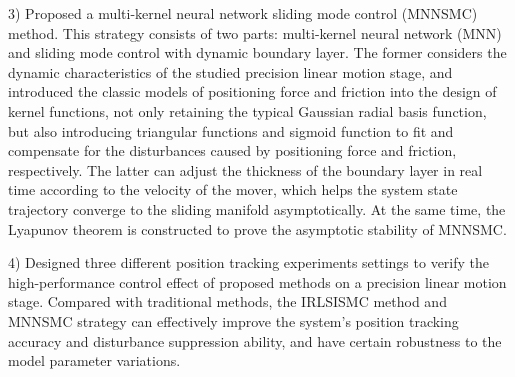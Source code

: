 \documentclass[type=master, oneside]{fduthesis}
\begin{document}
\begin{abstract*}
 
 3) Proposed a multi-kernel neural network sliding mode control (MNNSMC) method. This strategy consists of two parts: multi-kernel neural network (MNN) and sliding mode control with dynamic boundary layer. The former considers the dynamic characteristics of the studied precision linear motion stage, and introduced the classic models of positioning force and friction into the design of kernel functions, not only retaining the typical Gaussian radial basis function, but also introducing triangular functions and sigmoid function to fit and compensate for the disturbances caused by positioning force and friction, respectively. The latter can adjust the thickness of the boundary layer in real time according to the velocity of the mover, which helps the system state trajectory converge to the sliding manifold asymptotically. At the same time, the Lyapunov theorem is constructed to prove the asymptotic stability of MNNSMC. 
 
 4) Designed three different position tracking experiments settings to verify the high-performance control effect of proposed methods on a precision linear motion stage. Compared with traditional methods, the IRLSISMC method and MNNSMC strategy can effectively improve the system's position tracking accuracy and disturbance suppression ability, and have certain robustness to the model parameter variations.
\end{abstract*}
\end{document}

